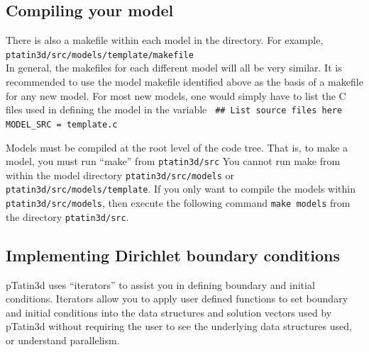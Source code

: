 \documentclass[paper=a4, fontsize=11pt,twoside]{scrartcl}
\newcommand{\ptat}{{pTatin3d}}
\newcommand{\shellcmd}[1]{\\\indent\indent\texttt{\hspace{5mm}\footnotesize #1}\\}
\newcommand{\unix}[1]{\texttt{\footnotesize #1}}
\begin{document}
{{\subsection{Compiling your model}
There is also a makefile within each model in the directory.
For example,
	\shellcmd{ptatin3d/src/models/template/makefile}
In general, the makefiles for each different model will all be very similar.
It is recommended to use the model makefile identified above as the basis of a makefile for any new model.
For most new models, one would simply have to list the C files used in defining the model in the variable
\newline
\unix{
\#\# List source files here \newline
MODEL\_SRC = \newline
        template.c \newline
}

Models must be compiled at the root level of the code tree.
That is, to make a model, you must run ``make'' from 
	\unix{ptatin3d/src}
You cannot run make from within the model directory
	\unix{ptatin3d/src/models}
or
	\unix{ptatin3d/src/models/template}.
If you only want to compile the models within
	\unix{ptatin3d/src/models},
then execute the following command
	\unix{make models}
from the directory
	\unix{ptatin3d/src}.

\subsection{Implementing Dirichlet boundary conditions}
{\ptat} uses ``iterators'' to assist you in defining boundary and initial conditions. Iterators allow you to apply user defined functions to set boundary and initial conditions into the data structures and solution vectors used by {\ptat} without requiring the user to see the underlying data structures used, or understand parallelism.

}}
\end{document}
